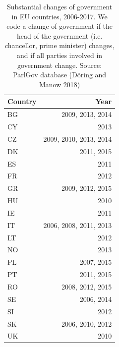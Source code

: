 \begin{table}[t]
\begin{tabular}{lr}
\toprule
Country &                           Year \\
\midrule
BG      &              2009, 2013, 2014 \\
CY      &                          2013 \\
CZ      &        2009, 2010, 2013, 2014 \\
DK      &                    2011, 2015 \\
ES      &                          2011 \\
FR      &                          2012 \\
GR      &              2009, 2012, 2015 \\
HU      &                          2010 \\
IE      &                          2011 \\
IT      &        2006, 2008, 2011, 2013 \\
LT      &                          2012 \\
NO      &                          2013 \\
PL      &                    2007, 2015 \\
PT      &                    2011, 2015 \\
RO      &              2008, 2012, 2015 \\
SE      &                    2006, 2014 \\
SI      &                          2012 \\
SK      &              2006, 2010, 2012 \\
UK      &                          2010 \\
\bottomrule
\end{tabular}
\caption[Changes of Government, EU countries]{Substantial changes of government in EU countries, 2006-2017. We code a change of government if the head of the government (i.e. chancellor, prime minister) changes, and if all parties involved in government change. Source: ParlGov database (Döring and Manow 2018)}
\label{table:changes_of_gov}
\end{table}

